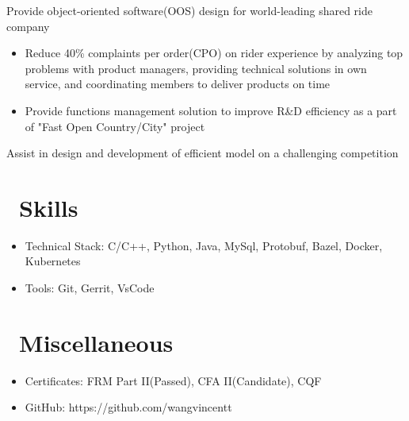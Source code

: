 \documentclass{resume}
\begin{document}
Provide object-oriented software(OOS) design for world-leading shared ride company
\begin{itemize}
  \item Reduce 40\% complaints per order(CPO) on rider experience by analyzing top problems with product managers, providing technical solutions in own service, and coordinating members to deliver products on time
  \item Provide functions management solution to improve R\&D efficiency as a part of "Fast Open Country/City" project
\end{itemize}


Assist in design and development of efficient model on a challenging competition


\section{\faCogs\ Skills}
\begin{itemize}[parsep=0.5ex]
  \item Technical Stack: C/C++, Python, Java, MySql, Protobuf, Bazel, Docker, Kubernetes
  \item Tools: Git, Gerrit, VsCode
\end{itemize}

\section{\faInfo\ Miscellaneous}
\begin{itemize}[parsep=0.5ex]
  \item Certificates: FRM Part II(Passed), CFA II(Candidate), CQF
  \item GitHub: https://github.com/wangvincentt
\end{itemize}

%
%
\end{document}
